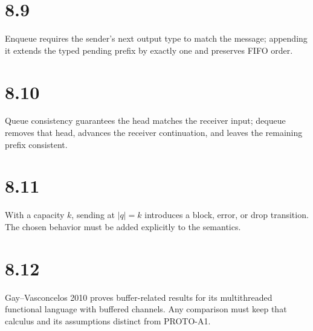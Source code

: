 \section*{8.9}
Enqueue requires the sender's next output type to match the message; appending it extends the typed pending prefix by exactly one and preserves FIFO order.

\section*{8.10}
Queue consistency guarantees the head matches the receiver input; dequeue removes that head, advances the receiver continuation, and leaves the remaining prefix consistent.

\section*{8.11}
With a capacity $k$, sending at $|q|=k$ introduces a block, error, or drop transition. The chosen behavior must be added explicitly to the semantics.

\section*{8.12}
Gay--Vasconcelos 2010 proves buffer-related results for its multithreaded functional language with buffered channels. Any comparison must keep that calculus and its assumptions distinct from PROTO-A1.
